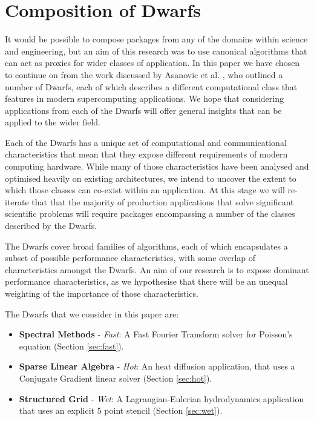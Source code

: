 \documentclass[runningheads,a4paper]{llncs}
\begin{document}
\section{Composition of Dwarfs}

It would be possible to compose packages from any of the domains within science and engineering, but an aim of this research was to use canonical algorithms that can act as proxies for wider classes of application. In this paper we have chosen to continue on from the work discussed by Asanovic et al. \cite{Asanovic2006}, who outlined a number of Dwarfs, each of which describes a different computational class that features in modern supercomputing applications. We hope that considering applications from each of the Dwarfs will offer general insights that can be applied to the wider field.

Each of the Dwarfs has a unique set of computational and communicational characteristics that mean that they expose different requirements of modern computing hardware. While many of those characteristics have been analysed and optimised heavily on existing architectures, we intend to uncover the extent to which those classes can co-exist within an application. At this stage we will re-iterate that that the majority of production applications that solve significant scientific problems will require packages encompassing a number of the classes described by the Dwarfs.

The Dwarfs cover broad families of algorithms, each of which encapsulates a subset of possible performance characteristics, with some overlap of characteristics amongst the Dwarfs. An aim of our research is to expose dominant performance characteristics, as we hypothesise that there will be an unequal weighting of the importance of those characteristics. 

The Dwarfs that we consider in this paper are:

\begin{itemize}
  \item \textbf{Spectral Methods} - \textit{Fast}: A Fast Fourier Transform solver for Poisson's equation (Section \ref{sec:fast}).
  \item \textbf{Sparse Linear Algebra} - \textit{Hot}: An heat diffusion application, that uses a Conjugate Gradient linear solver (Section \ref{sec:hot}).
  \item \textbf{Structured Grid} - \textit{Wet}: A Lagrangian-Eulerian hydrodynamics application that uses an explicit 5 point stencil (Section \ref{sec:wet}).
\end{itemize}
\end{document}
